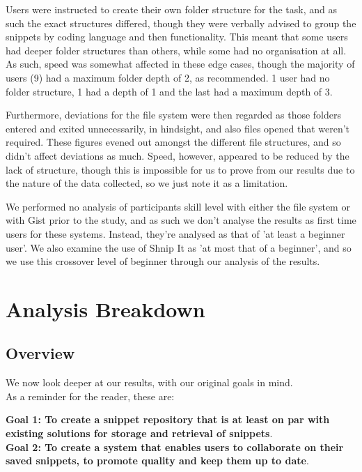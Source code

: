 Users were instructed to create their own folder structure for the task, and as such the exact structures differed, though they were verbally advised to group the snippets by coding language and then functionality. 
This meant that some users had deeper folder structures than others, while some had no organisation at all. 
As such, speed was somewhat affected in these edge cases, though the majority of users (9) had a maximum folder depth of 2, as recommended. 1 user had no folder structure, 1 had a depth of 1 and the last had a maximum depth of 3.

Furthermore, deviations for the file system were then regarded as those folders entered and exited unnecessarily, in hindsight, and also files opened that weren't required.
These figures evened out amongst the different file structures, and so didn't affect deviations as much.
Speed, however, appeared to be reduced by the lack of structure, though this is impossible for us to prove from our results due to the nature of the data collected, so we just note it as a limitation.

We performed no analysis of participants skill level with either the file system or with Gist prior to the study, and as such we don't analyse the results as first time users for these systems. 
Instead, they're analysed as that of 'at least a beginner user'.
We also examine the use of Shnip It as 'at most that of a beginner', and so we use this crossover level of beginner through our analysis of the results.

\section{Analysis Breakdown}
\subsection{Overview}
We now look deeper at our results, with our original goals in mind.\\
As a reminder for the reader, these are:

\textbf{Goal 1: To create a snippet repository that is at least on par with existing solutions for storage and retrieval of snippets}. \\
\textbf{Goal 2: To create a system that enables users to collaborate on their saved snippets, to promote quality and keep them up to date}.








